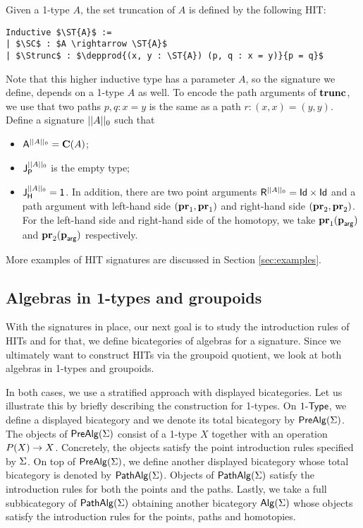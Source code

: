 \begin{example}
\label{ex:settrunc}
Given a 1-type $A$,  the set truncation of $A$ is defined by the following HIT:
\begin{lstlisting}[mathescape=true]
Inductive $\ST{A}$ :=
| $\SC$ : $A \rightarrow \ST{A}$
| $\Strunc$ : $\depprod{(x, y : \ST{A}) (p, q : x = y)}{p = q}$
\end{lstlisting}
Note that this higher inductive type has a parameter $A$,
so the signature we define, depends on a 1-type $A$ as well.
To encode the path arguments of $\Strunc$, we use that two paths $p, q : x = y$ is the same as a path $r : (x, x) = (y, y)$.
Define a signature $\ST{A}$ such that
\begin{itemize}
	\item $\pointconstr[\ST{A}] = \constantP{A}$;
	\item $\pathlabel[\ST{A}]$ is the empty type;
	\item $\homotlabel[\ST{A}] = \unit$.
	In addition, there are two point arguments $\homotpointarg[\ST{A}] = \prodP{\idP}{\idP}$
	and a path argument with left-hand side $\pair{\prle}{\prle}$ and right-hand side $\pair{\prre}{\prre}$.
	For the left-hand side and right-hand side of the homotopy, we take $\hprl{\harg}$ and $\hprr{\harg}$ respectively.
\end{itemize}
\end{example}


More examples of HIT signatures are discussed in Section \ref{sec:examples}.

\subsection{Algebras in 1-types and groupoids}
With the signatures in place, our next goal is to study the introduction rules of HITs and for that, we define bicategories of algebras for a signature.
Since we ultimately want to construct HITs via the groupoid quotient, we look at both algebras in 1-types and groupoids.

In both cases, we use a stratified approach with displayed bicategories.
Let us illustrate this by briefly describing the construction for 1-types.
On $\onetypes$, we define a displayed bicategory and we denote its total bicategory by $\prealg{\sign}$.
The objects of $\prealg{\sign}$ consist of a 1-type $X$ together with an operation $\polyAct{P}{X} \rightarrow X$.
Concretely, the objects satisfy the point introduction rules specified by $\sign$.
On top of $\prealg{\sign}$, we define another displayed bicategory whose total bicategory is denoted by $\pathalg{\sign}$.
Objects of $\pathalg{\sign}$ satisfy the introduction rules for both the points and the paths.
Lastly, we take a full subbicategory of $\pathalg{\sign}$ obtaining another bicategory $\alg(\sign)$ whose objects satisfy the introduction rules for the points, paths and homotopies.

